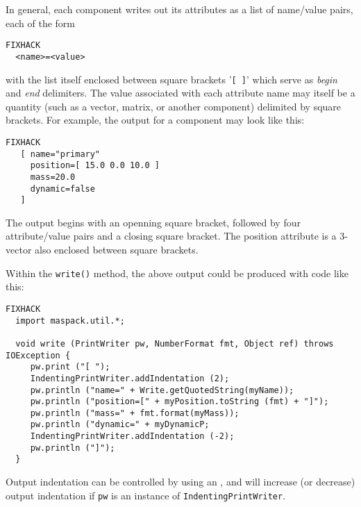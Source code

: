 \documentclass{article}
\begin{document}
In general, each component writes out its attributes as a list
of name/value pairs, each of the form
\begin{lstlisting}FIXHACK
  <name>=<value>
\end{lstlisting}
with the list itself enclosed between square brackets '{\tt [ ]}' which
serve as {\it begin} and {\it end} delimiters. The value associated with each
attribute name may itself be a quantity (such as a vector, matrix, or
another component) delimited by square brackets. For example, the
output for a  component
may look like this:
\begin{lstlisting}FIXHACK
   [ name="primary"
     position=[ 15.0 0.0 10.0 ]
     mass=20.0
     dynamic=false
   ]
\end{lstlisting}
The output begins with an openning square bracket, followed by four
attribute/value pairs and a closing square bracket. The position
attribute is a 3-vector also enclosed between square brackets.

Within the {\tt write()} method, the above output could be produced
with code like this:
\begin{lstlisting}FIXHACK
  import maspack.util.*;

  void write (PrintWriter pw, NumberFormat fmt, Object ref) throws IOException {
     pw.print ("[ ");
     IndentingPrintWriter.addIndentation (2); 
     pw.println ("name=" + Write.getQuotedString(myName));
     pw.println ("position=[" + myPosition.toString (fmt) + "]");
     pw.println ("mass=" + fmt.format(myMass));
     pw.println ("dynamic=" + myDynamicP;
     IndentingPrintWriter.addIndentation (-2);
     pw.println ("]");
  }
\end{lstlisting}
Output indentation can be controlled by using an
, and
will increase (or decrease) output indentation if
{\tt pw} is an instance of {\tt IndentingPrintWriter}.
\end{document}

